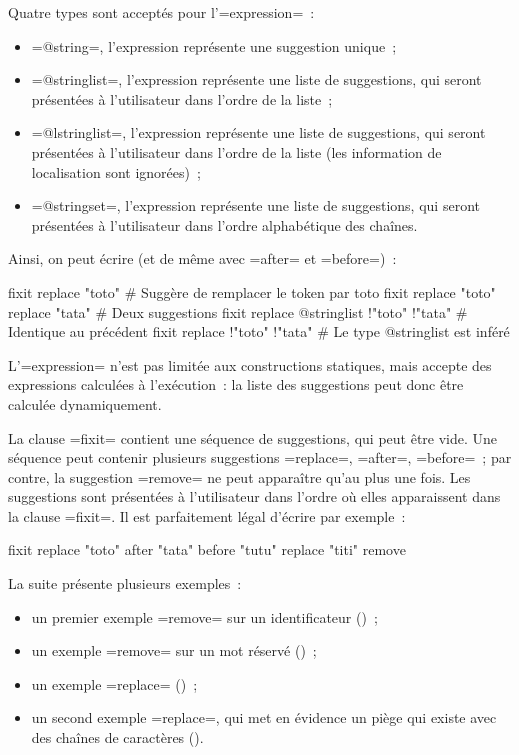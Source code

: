 Quatre types sont acceptés pour l'\ggst=expression=~:
\begin{itemize}
  \item \ggst=@string=, l'expression représente une suggestion unique~;
  \item \ggst=@stringlist=, l'expression représente une liste de suggestions, qui seront présentées à l'utilisateur dans l'ordre de la liste~;
  \item \ggst=@lstringlist=, l'expression représente une liste de suggestions, qui seront présentées à l'utilisateur dans l'ordre de la liste (les information de localisation sont ignorées)~;
  \item \ggst=@stringset=, l'expression représente une liste de suggestions, qui seront présentées à l'utilisateur dans l'ordre alphabétique des chaînes.
\end{itemize}

Ainsi, on peut écrire (et de même avec \ggst=after= et \ggst=before=)~:
\begin{galgas3}
fixit { replace "toto" } # Suggère de remplacer le token par toto
fixit { replace "toto" replace "tata" } # Deux suggestions
fixit { replace @stringlist {!"toto" !"tata"} } # Identique au précédent
fixit { replace {!"toto" !"tata"} } # Le type @stringlist est inféré
\end{galgas3}


L'\ggst=expression= n'est pas limitée aux constructions statiques, mais accepte des expressions calculées à l'exécution~: la liste des suggestions peut donc être calculée dynamiquement.

La clause \ggst=fixit= contient une séquence de suggestions, qui peut être vide. Une séquence peut contenir plusieurs suggestions \ggst=replace=, \ggst=after=, \ggst=before=~; par contre, la suggestion \ggst=remove= ne peut apparaître qu'au plus une fois. Les suggestions sont présentées à l'utilisateur dans l'ordre où elles apparaissent dans la clause \ggst=fixit=. Il est parfaitement légal d'écrire par exemple~:
\begin{galgas3}
fixit {
  replace "toto"
  after "tata"
  before "tutu"
  replace "titi"
  remove
}
\end{galgas3}


La suite présente plusieurs exemples~:
\begin{itemize}
  \item un premier exemple \ggst=remove= sur un identificateur ()~;
  \item un exemple  \ggst=remove= sur un mot réservé ()~;
  \item un exemple \ggst=replace= ()~;
  \item un second exemple \ggst=replace=, qui met en évidence un piège qui existe avec des chaînes de caractères ().
\end{itemize}

